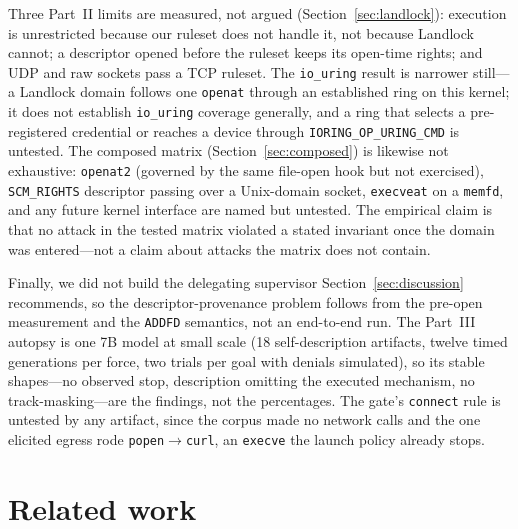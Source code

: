 \documentclass[11pt]{article}
\begin{document}
Three Part~II limits are measured, not argued (Section~\ref{sec:landlock}): execution is unrestricted
because our ruleset does not handle it, not because Landlock cannot; a descriptor opened before the ruleset
keeps its open-time rights; and UDP and raw sockets pass a TCP ruleset. The \texttt{io\_uring} result is
narrower still---a Landlock domain follows one \texttt{openat} through an established ring on this kernel;
it does not establish \texttt{io\_uring} coverage generally, and a ring that selects a pre-registered
credential or reaches a device through \texttt{IORING\_OP\_URING\_CMD} is untested. The composed matrix
(Section~\ref{sec:composed}) is likewise not exhaustive: \texttt{openat2} (governed by the same file-open
hook but not exercised), \texttt{SCM\_RIGHTS} descriptor passing over a Unix-domain socket,
\texttt{execveat} on a \texttt{memfd}, and any future kernel interface are named but untested. The
empirical claim is that no attack in the tested matrix violated a stated invariant once the domain was
entered---not a claim about attacks the matrix does not contain.

Finally, we did not build the delegating supervisor Section~\ref{sec:discussion} recommends, so the
descriptor-provenance problem follows from the pre-open measurement and the \texttt{ADDFD} semantics, not
an end-to-end run. The Part~III autopsy is one 7B model at small scale (18 self-description artifacts,
twelve timed generations per force, two trials per goal with denials simulated), so its stable
shapes---no observed stop, description omitting the executed mechanism, no track-masking---are the
findings, not the percentages. The gate's \texttt{connect} rule is untested by any artifact, since the
corpus made no network calls and the one elicited egress rode \texttt{popen}$\rightarrow$\texttt{curl}, an
\texttt{execve} the launch policy already stops.

\section{Related work}\label{sec:related}
\end{document}
